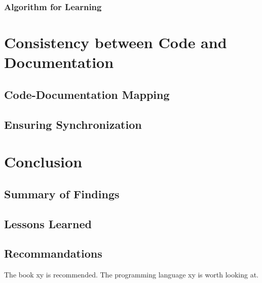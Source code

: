         \subsection{Algorithm for Learning}\label{subsec:learning-cards-algorithm}

\chapter{Consistency between Code and Documentation}\label{chap:consistency}
    \section{Code-Documentation Mapping}\label{sec:code-doc-mapping}
    \section{Ensuring Synchronization}\label{sec:synchronization}

\chapter{Conclusion}\label{chap:conclusion}
    \section{Summary of Findings}\label{sec:findings-summary}
    \section{Lessons Learned}\label{sec:lessons-learned}
    \section{Recommandations}
The book xy is recommended. The programming language xy is worth looking at.




